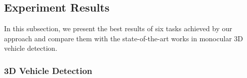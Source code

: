 \subsection{Experiment Results}
In this subsection, we present the best results of six tasks achieved by our approach and compare them with the state-of-the-art works in monocular 3D vehicle detection.

\subsubsection{3D Vehicle Detection}

